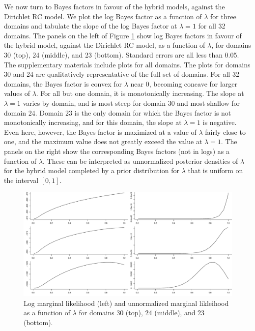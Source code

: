 \documentclass[11pt,letter]{article}
\newcommand{\DP}{Dirichlet RC model}
\begin{document}
We now turn to Bayes factors in favour of the hybrid models, against the \DP{}.
We plot the log Bayes factor as a function of $\lambda$ for three domains and tabulate the slope of the log Bayes factor at $\lambda = 1$ for all 32 domains.
The panels on the left of Figure \ref{f:BF_by_lambda} show log Bayes factors in favour of the hybrid model, against the \DP{}, as a function of $\lambda$, for domains 30 (top), 24 (middle), and 23 (bottom).
Standard errors are all less than 0.05.
The supplementary materials include plots for all domains.
The plots for domains 30 and 24 are qualitatively representative of the full set of domains.
For all 32 domains, the Bayes factor is convex for $\lambda$ near 0, becoming concave for larger values of $\lambda$.
For all but one domain, it is monotonically increasing.
The slope at $\lambda = 1$ varies by domain, and is most steep for domain 30 and most shallow for domain 24.
Domain 23 is the only domain for which the Bayes factor is not monotonically increasing, and for this domain, the slope at $\lambda = 1$ is negative.
Even here, however, the Bayes factor is maximized at a value of $\lambda$ fairly close to one, and the maximum value does not greatly exceed the value at $\lambda = 1$.
The panels on the right show the corresponding Bayes factors (not in logs) as a function of $\lambda$.
These can be interpreted as unnormalized posterior densities of $\lambda$ for the hybrid model completed by a prior distribution for $\lambda$ that is uniform on the interval $[0,1]$.

\begin{figure}
  \centering
  \includegraphics[width=\textwidth]{figures/BF_by_lambda.pdf}
  \caption{Log marginal likelihood (left) and unnormalized marginal likleihood as a function of $\lambda$ for domains 30 (top), 24 (middle), and 23 (bottom).}
  \label{f:BF_by_lambda}
\end{figure}
\end{document}
